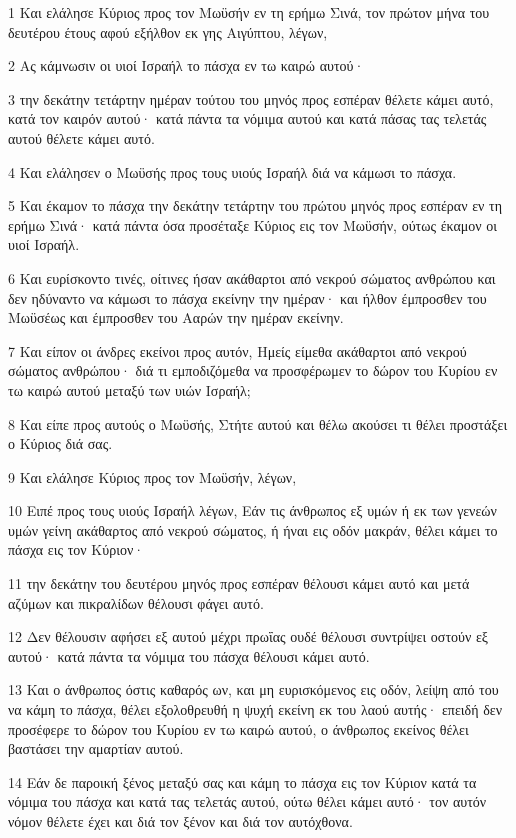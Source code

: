 \par 1 Και ελάλησε Κύριος προς τον Μωϋσήν εν τη ερήμω Σινά, τον πρώτον μήνα του δευτέρου έτους αφού εξήλθον εκ γης Αιγύπτου, λέγων,
\par 2 Ας κάμνωσιν οι υιοί Ισραήλ το πάσχα εν τω καιρώ αυτού·
\par 3 την δεκάτην τετάρτην ημέραν τούτου του μηνός προς εσπέραν θέλετε κάμει αυτό, κατά τον καιρόν αυτού· κατά πάντα τα νόμιμα αυτού και κατά πάσας τας τελετάς αυτού θέλετε κάμει αυτό.
\par 4 Και ελάλησεν ο Μωϋσής προς τους υιούς Ισραήλ διά να κάμωσι το πάσχα.
\par 5 Και έκαμον το πάσχα την δεκάτην τετάρτην του πρώτου μηνός προς εσπέραν εν τη ερήμω Σινά· κατά πάντα όσα προσέταξε Κύριος εις τον Μωϋσήν, ούτως έκαμον οι υιοί Ισραήλ.
\par 6 Και ευρίσκοντο τινές, οίτινες ήσαν ακάθαρτοι από νεκρού σώματος ανθρώπου και δεν ηδύναντο να κάμωσι το πάσχα εκείνην την ημέραν· και ήλθον έμπροσθεν του Μωϋσέως και έμπροσθεν του Ααρών την ημέραν εκείνην.
\par 7 Και είπον οι άνδρες εκείνοι προς αυτόν, Ημείς είμεθα ακάθαρτοι από νεκρού σώματος ανθρώπου· διά τι εμποδιζόμεθα να προσφέρωμεν το δώρον του Κυρίου εν τω καιρώ αυτού μεταξύ των υιών Ισραήλ;
\par 8 Και είπε προς αυτούς ο Μωϋσής, Στήτε αυτού και θέλω ακούσει τι θέλει προστάξει ο Κύριος διά σας.
\par 9 Και ελάλησε Κύριος προς τον Μωϋσήν, λέγων,
\par 10 Ειπέ προς τους υιούς Ισραήλ λέγων, Εάν τις άνθρωπος εξ υμών ή εκ των γενεών υμών γείνη ακάθαρτος από νεκρού σώματος, ή ήναι εις οδόν μακράν, θέλει κάμει το πάσχα εις τον Κύριον·
\par 11 την δεκάτην του δευτέρου μηνός προς εσπέραν θέλουσι κάμει αυτό και μετά αζύμων και πικραλίδων θέλουσι φάγει αυτό.
\par 12 Δεν θέλουσιν αφήσει εξ αυτού μέχρι πρωΐας ουδέ θέλουσι συντρίψει οστούν εξ αυτού· κατά πάντα τα νόμιμα του πάσχα θέλουσι κάμει αυτό.
\par 13 Και ο άνθρωπος όστις καθαρός ων, και μη ευρισκόμενος εις οδόν, λείψη από του να κάμη το πάσχα, θέλει εξολοθρευθή η ψυχή εκείνη εκ του λαού αυτής· επειδή δεν προσέφερε το δώρον του Κυρίου εν τω καιρώ αυτού, ο άνθρωπος εκείνος θέλει βαστάσει την αμαρτίαν αυτού.
\par 14 Εάν δε παροική ξένος μεταξύ σας και κάμη το πάσχα εις τον Κύριον κατά τα νόμιμα του πάσχα και κατά τας τελετάς αυτού, ούτω θέλει κάμει αυτό· τον αυτόν νόμον θέλετε έχει και διά τον ξένον και διά τον αυτόχθονα.
